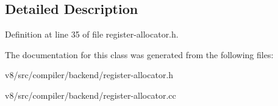 \subsection{Detailed Description}


Definition at line 35 of file register-\/allocator.\+h.



The documentation for this class was generated from the following files\+:\begin{DoxyCompactItemize}
\item 
v8/src/compiler/backend/register-\/allocator.\+h\item 
v8/src/compiler/backend/register-\/allocator.\+cc\end{DoxyCompactItemize}
